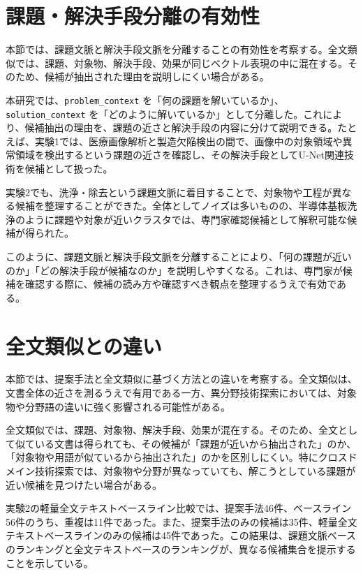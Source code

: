 \section{課題・解決手段分離の有効性}

本節では、課題文脈と解決手段文脈を分離することの有効性を考察する。全文類似では、課題、対象物、解決手段、効果が同じベクトル表現の中に混在する。そのため、候補が抽出された理由を説明しにくい場合がある。

本研究では、\texttt{problem\_context} を「何の課題を解いているか」、\texttt{solution\_context} を「どのように解いているか」として分離した。これにより、候補抽出の理由を、課題の近さと解決手段の内容に分けて説明できる。たとえば、実験1では、医療画像解析と製造欠陥検出の間で、画像中の対象領域や異常領域を検出するという課題の近さを確認し、その解決手段としてU-Net関連技術を候補として扱った。

実験2でも、洗浄・除去という課題文脈に着目することで、対象物や工程が異なる候補を整理することができた。全体としてノイズは多いものの、半導体基板洗浄のように課題や対象が近いクラスタでは、専門家確認候補として解釈可能な候補が得られた。

このように、課題文脈と解決手段文脈を分離することにより、「何の課題が近いのか」「どの解決手段が候補なのか」を説明しやすくなる。これは、専門家が候補を確認する際に、候補の読み方や確認すべき観点を整理するうえで有効である。

\section{全文類似との違い}

本節では、提案手法と全文類似に基づく方法との違いを考察する。全文類似は、文書全体の近さを測るうえで有用である一方、異分野技術探索においては、対象物や分野語の違いに強く影響される可能性がある。

全文類似では、課題、対象物、解決手段、効果が混在する。そのため、全文として似ている文書は得られても、その候補が「課題が近いから抽出された」のか、「対象物や用語が似ているから抽出された」のかを区別しにくい。特にクロスドメイン技術探索では、対象物や分野が異なっていても、解こうとしている課題が近い候補を見つけたい場合がある。

実験2の軽量全文テキストベースライン比較では、提案手法46件、ベースライン56件のうち、重複は11件であった。また、提案手法のみの候補は35件、軽量全文テキストベースラインのみの候補は45件であった。この結果は、課題文脈ベースのランキングと全文テキストベースのランキングが、異なる候補集合を提示することを示している。

